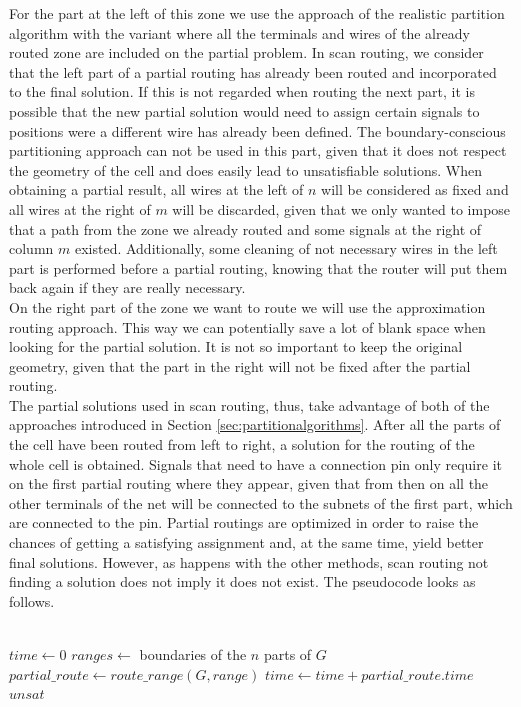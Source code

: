 For the part at the left of this zone we use the approach of the realistic partition algorithm with the variant where all the terminals and wires of the already routed zone are included on the partial problem. In scan routing, we consider that the left part of a partial routing has already been routed and incorporated to the final solution. If this is not regarded when routing the next part, it is possible that the new partial solution would need to assign certain signals to positions were a different wire has already been defined. The boundary-conscious partitioning approach can not be used in this part, given that it does not respect the geometry of the cell and does easily lead to unsatisfiable solutions. When obtaining a partial result, all wires at the left of $n$ will be considered as fixed and all wires at the right of $m$ will be discarded, given that we only wanted to impose that a path from the zone we already routed and some signals at the right of column $m$ existed. Additionally, some cleaning of not necessary wires in the left part is performed before a partial routing, knowing that the router will put them back again if they are really necessary. \\

On the right part of the zone we want to route we will use the approximation routing approach. This way we can potentially save a lot of blank space when looking for the partial solution. It is not so important to keep the original geometry, given that the part in the right will not be fixed after the partial routing. \\

The partial solutions used in scan routing, thus, take advantage of both of the approaches introduced in Section \ref{sec:partitionalgorithms}. After all the parts of the cell have been routed from left to right, a solution for the routing of the whole cell is obtained. Signals that need to have a connection pin only require it on the first partial routing where they appear, given that from then on all the other terminals of the net will be connected to the subnets of the first part, which are connected to the pin. Partial routings are optimized in order to raise the chances of getting a satisfying assignment and, at the same time, yield better final solutions. However, as happens with the other methods, scan routing not finding a solution does not imply it does not exist. The pseudocode looks as follows.\\

\small
\begin{algorithmic}
 \\
\State $time \gets 0$
\State $ranges \gets $ boundaries of the $n$ parts of $G$
	\State $partial\_route \gets route\_range(G, range)$
		\State $time \gets time + partial\_route.time$
	\Else
		\State \Return $unsat$
	\EndIf
\EndFor
\EndFunction

\end{algorithmic} 
\normalsize


